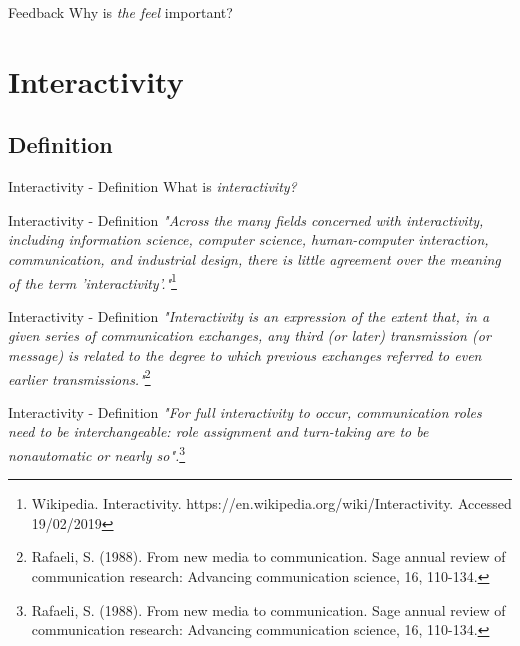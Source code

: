 \documentclass{beamer}
\begin{document}
\begin{frame}{Feedback}
    Why is \textit{the feel} important?\\
\end{frame}

\section{Interactivity}

\subsection{Definition}

\begin{frame}{Interactivity - Definition} 
    What is \textit{interactivity?}
\end{frame}

\begin{frame}{Interactivity - Definition} 
    \textit{"Across the many fields concerned with interactivity, including information science, computer science, human-computer interaction, communication, and industrial design, there is little agreement over the meaning of the term 'interactivity'."}\footnote{Wikipedia. Interactivity. https://en.wikipedia.org/wiki/Interactivity. Accessed 19/02/2019}
\end{frame}

\begin{frame}{Interactivity - Definition} 
    \textit{"Interactivity is an expression of the extent that, in a given series of communication exchanges, any third (or later) transmission (or message) is related to the degree to which previous exchanges referred to even earlier transmissions."}\footnote{Rafaeli, S. (1988). From new media to communication. Sage annual review of communication research: Advancing communication science, 16, 110-134.}
\end{frame}

\begin{frame}{Interactivity - Definition} 
    \textit{"For full interactivity to occur, communication roles need to be interchangeable: role assignment and turn-taking are to be nonautomatic or nearly so".}\footnote{Rafaeli, S. (1988). From new media to communication. Sage annual review of communication research: Advancing communication science, 16, 110-134.}
\end{frame}
\end{document}
